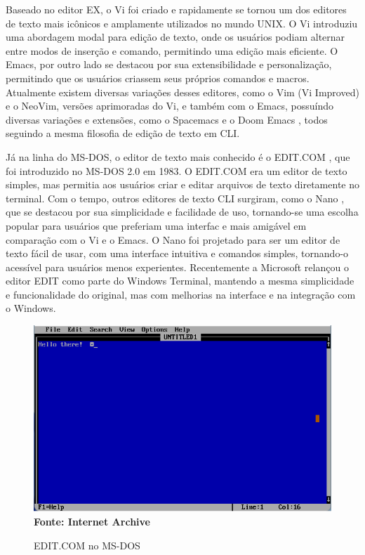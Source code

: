 Baseado no editor EX, o Vi foi criado e rapidamente se tornou um dos editores de texto mais icônicos e amplamente utilizados no mundo UNIX.
O Vi introduziu uma abordagem modal para edição de texto, onde os usuários podiam alternar entre modos de inserção e comando, permitindo uma edição mais
eficiente. O Emacs, por outro lado  se destacou por sua extensibilidade e personalização, permitindo que os usuários criassem seus próprios comandos e macros.
Atualmente existem diversas variações desses editores, como o Vim (Vi Improved) \cite{Vim} e o NeoVim, \cite{Neovim_Project} versões aprimoradas do Vi, e
também com o Emacs, possuíndo diversas variações e extensões, como o Spacemacs \cite{Spacemacs} e o Doom Emacs \cite{DoomEmacs}, todos seguindo a mesma
filosofia de edição de texto em CLI.

Já na linha do MS-DOS, o editor de texto mais conhecido é o EDIT.COM \cite{MicrosoftEdit2025}, que foi introduzido no MS-DOS 2.0 em 1983. O EDIT.COM era um
editor de texto simples, mas permitia aos usuários criar e editar arquivos de texto diretamente no terminal. Com o tempo, outros editores de texto CLI surgiram,
como o Nano \cite{Nano2025}, que se destacou por sua simplicidade e facilidade de uso, tornando-se uma escolha popular para usuários que preferiam uma interfac
e mais amigável em comparação com o Vi e o Emacs. O Nano foi projetado para ser um editor de texto fácil de usar, com uma interface intuitiva e comandos simples,
tornando-o acessível para usuários menos experientes. Recentemente a Microsoft relançou o editor EDIT como parte do Windows Terminal, mantendo a mesma
simplicidade e funcionalidade do original, mas com melhorias na interface e na integração com o Windows.

\FloatBarrier
\begin{figure}[!htbp]
	\centering
	\caption{EDIT.COM no MS-DOS}
	\includegraphics[scale=0.8]{imagens/EDIT_MSDOS}
	\\\textbf{Fonte: Internet Archive}
	\label{fig:EDIT_MSDOS}
\end{figure}
\FloatBarrier

